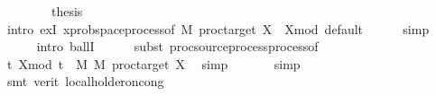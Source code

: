 \begin{isabellebody}
\isanewline
\ \ \isamarkupfalse%
\isanewline
\isanewline
\ \ \isamarkupfalse%
\ \isamarkupfalse%
\ {\isacharquery}{\kern0pt}thesis\isanewline
\ \ \ \ \isamarkupfalse%
\ {\isacharparenleft}{\kern0pt}intro\ exI{\isacharbrackleft}{\kern0pt}\ x{\isacharequal}{\kern0pt}{\isachardoublequoteopen}prob{\isacharunderscore}{\kern0pt}space{\isachardot}{\kern0pt}process{\isacharunderscore}{\kern0pt}of\ {\isacharquery}{\kern0pt}M\ {\isacharparenleft}{\kern0pt}proc{\isacharunderscore}{\kern0pt}target\ X{\isacharparenright}{\kern0pt}\ {\isacharbraceleft}{\kern0pt}{}{\isachardot}{\kern0pt}{\isachardot}{\kern0pt}{\isacharbraceright}{\kern0pt}\ {\isacharparenleft}{\kern0pt}X{\isacharunderscore}{\kern0pt}mod{\isacharparenright}{\kern0pt}\ default{\isachardoublequoteclose}{\isacharbrackright}{\kern0pt}{\isacharparenright}{\kern0pt}\isanewline
\ \ \ \ \isamarkupfalse%
\ simp\isanewline
\ \ \ \ \isamarkupfalse%
\ {\isacharparenleft}{\kern0pt}intro\ ballI{\isacharparenright}{\kern0pt}\isanewline
\ \ \ \ \isamarkupfalse%
\ {\isacharparenleft}{\kern0pt}subst\ proc{\isacharunderscore}{\kern0pt}source{\isachardot}{\kern0pt}process{\isacharunderscore}{\kern0pt}process{\isacharunderscore}{\kern0pt}of{\isacharparenright}{\kern0pt}\isanewline
\ \ \ \ \isamarkupfalse%
\ {\isacartoucheopen}{\isasymforall}t{\isasymin}{\isacharbraceleft}{\kern0pt}{}{\isachardot}{\kern0pt}{\isachardot}{\kern0pt}{\isacharbraceright}{\kern0pt}{\isachardot}{\kern0pt}\ X{\isacharunderscore}{\kern0pt}mod\ t\ {\isasymin}\ {\isacharquery}{\kern0pt}M\ {\isasymrightarrow}\isactrlsub M\ proc{\isacharunderscore}{\kern0pt}target\ X{\isacartoucheclose}\ \isamarkupfalse%
\ simp\isanewline
\ \ \ \ \ \isamarkupfalse%
\ simp\isanewline
\ \ \ \ \isamarkupfalse%
\ {\isacharparenleft}{\kern0pt}smt\ {\isacharparenleft}{\kern0pt}verit{\isacharparenright}{\kern0pt}\ local{\isacharunderscore}{\kern0pt}holder{\isacharunderscore}{\kern0pt}on{\isacharunderscore}{\kern0pt}cong{\isacharparenright}{\kern0pt}\isanewline
{}\isamarkupfalse%
%
\endisatagproof
{\isafoldproof}%
%
\isadelimproof
%
\endisadelimproof
\isanewline
%
\isadelimtheory
\isanewline
%
\endisadelimtheory
%
\isatagtheory
{}\isamarkupfalse%
%
\endisatagtheory
{\isafoldtheory}%
%
\isadelimtheory
%
\endisadelimtheory
%
\end{isabellebody}%
\endinput
